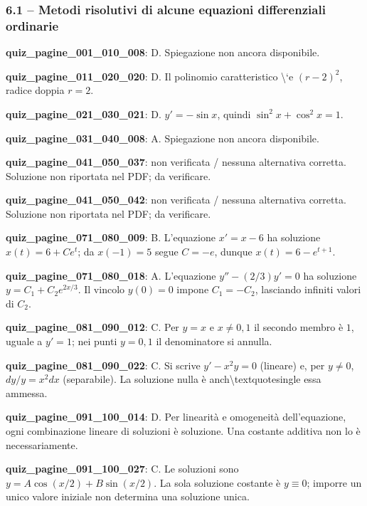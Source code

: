 \documentclass[11pt,a4paper]{article}
\newcounter{quiz}
\begin{document}
\subsubsection*{6.1 -- Metodi risolutivi di alcune equazioni differenziali ordinarie}
\noindent\textbf{quiz\_pagine\_001\_010\_008}: D. Spiegazione non ancora disponibile.\par\medskip
\noindent\textbf{quiz\_pagine\_011\_020\_020}: D. Il polinomio caratteristico \textbackslash{}`e $(r-2)^2$, radice doppia $r=2$.\par\medskip
\noindent\textbf{quiz\_pagine\_021\_030\_021}: D. $y\prime=-\sin x$, quindi $\sin^2x+\cos^2x=1$.\par\medskip
\noindent\textbf{quiz\_pagine\_031\_040\_008}: A. Spiegazione non ancora disponibile.\par\medskip
\noindent\textbf{quiz\_pagine\_041\_050\_037}: non verificata / nessuna alternativa corretta. Soluzione non riportata nel PDF; da verificare.\par\medskip
\noindent\textbf{quiz\_pagine\_041\_050\_042}: non verificata / nessuna alternativa corretta. Soluzione non riportata nel PDF; da verificare.\par\medskip
\noindent\textbf{quiz\_pagine\_071\_080\_009}: B. L'equazione $x'=x-6$ ha soluzione $x(t)=6+Ce^t$; da $x(-1)=5$ segue $C=-e$, dunque $x(t)=6-e^{t+1}$.\par\medskip
\noindent\textbf{quiz\_pagine\_071\_080\_018}: A. L'equazione $y''-(2/3)y'=0$ ha soluzione $y=C_1+C_2e^{2x/3}$. Il vincolo $y(0)=0$ impone $C_1=-C_2$, lasciando infiniti valori di $C_2$.\par\medskip
\noindent\textbf{quiz\_pagine\_081\_090\_012}: C. Per $y=x$ e $x\neq0,1$ il secondo membro è $1$, uguale a $y\prime=1$; nei punti $y=0,1$ il denominatore si annulla.\par\medskip
\noindent\textbf{quiz\_pagine\_081\_090\_022}: C. Si scrive $y\prime-x^2y=0$ (lineare) e, per $y\neq0$, $dy/y=x^2dx$ (separabile). La soluzione nulla è anch\textbackslash{}textquotesingle essa ammessa.\par\medskip
\noindent\textbf{quiz\_pagine\_091\_100\_014}: D. Per linearità e omogeneità dell'equazione, ogni combinazione lineare di soluzioni è soluzione. Una costante additiva non lo è necessariamente.\par\medskip
\noindent\textbf{quiz\_pagine\_091\_100\_027}: C. Le soluzioni sono $y=A\cos(x/2)+B\sin(x/2)$. La sola soluzione costante è $y\equiv0$; imporre un unico valore iniziale non determina una soluzione unica.\par\medskip
\end{document}
